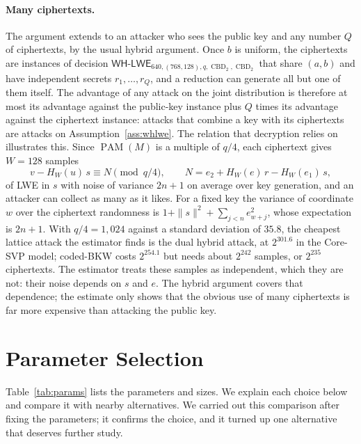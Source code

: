 \documentclass[11pt,a4paper]{article}
\theoremstyle{definition}
\newcommand{\CBD}{\operatorname{CBD}}
\newcommand{\PAM}{\operatorname{PAM}}
\newcommand{\WHLWE}{\textsf{WH-LWE}}
\begin{document}
\paragraph{Many ciphertexts.} The argument extends to an attacker who sees the public key and any number $Q$ of ciphertexts, by the usual hybrid argument. Once $b$ is uniform, the ciphertexts are instances of decision $\WHLWE_{640,(768,128),q,\CBD_2,\CBD_2}$ that share $(a, b)$ and have independent secrets $r_1, \dots, r_Q$, and a reduction can generate all but one of them itself. The advantage of any attack on the joint distribution is therefore at most its advantage against the public-key instance plus $Q$ times its advantage against the ciphertext instance: attacks that combine a key with its ciphertexts are attacks on Assumption~\ref{ass:whlwe}. The relation that decryption relies on illustrates this. Since $\PAM(M)$ is a multiple of $q/4$, each ciphertext gives $W = 128$ samples
\[
v - H_W(u)\,s \equiv N \pmod{q/4}, \qquad N = e_2 + H_W(e)\,r - H_W(e_1)\,s,
\]
of LWE in $s$ with noise of variance $2n + 1$ on average over key generation, and an attacker can collect as many as it likes. For a fixed key the variance of coordinate $w$ over the ciphertext randomness is $1 + \|s\|^2 + \sum_{j<n} e_{w+j}^2$, whose expectation is $2n + 1$. With $q/4 = 1{,}024$ against a standard deviation of $35.8$, the cheapest lattice attack the estimator finds is the dual hybrid attack, at $2^{301.6}$ in the Core-SVP model; coded-BKW costs $2^{254.1}$ but needs about $2^{242}$ samples, or $2^{235}$ ciphertexts. The estimator treats these samples as independent, which they are not: their noise depends on $s$ and $e$. The hybrid argument covers that dependence; the estimate only shows that the obvious use of many ciphertexts is far more expensive than attacking the public key.

\section{Parameter Selection}\label{sec:params}

Table~\ref{tab:params} lists the parameters and sizes. We explain each choice below and compare it with nearby alternatives. We carried out this comparison after fixing the parameters; it confirms the choice, and it turned up one alternative that deserves further study.
\end{document}
